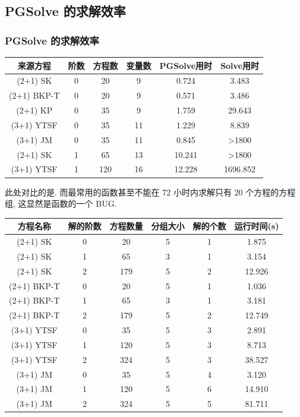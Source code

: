 \subsection{PGSolve 的求解效率}
\begin{frame}
\frametitle{PGSolve 的求解效率}
\begin{adjustbox}{max width=\textwidth}
\centering
\renewcommand{\arraystretch}{1.3}
\begin{tabular}{cccccc}
\hline
来源方程 & 阶数 & 方程数 & 变量数 & PGSolve用时 & Solve用时 \\
\hline
(2+1) SK & 0 & 20 & 9 & 0.724 & 3.483 \\
(2+1) BKP-T & 0 & 20 & 9 & 0.571 & 3.486 \\
(2+1) KP & 0 & 35 & 9 & 1.759 & 29.643 \\
(3+1) YTSF & 0 & 35 & 11 & 1.229 & 8.839 \\
(3+1) JM & 0 & 35 & 11 & 0.845 & >1800 \\
(2+1) SK & 1 & 65 & 13 & 10.241 & >1800 \\
(3+1) YTSF & 1 & 120 & 16 & 12.228 & 1696.852 \\
\hline
\end{tabular}
\end{adjustbox}

\vspace{1em}

此处对比的是. 而最常用的函数甚至不能在 72 小时内求解只有 20 个方程的方程组, 这显然是函数的一个 BUG.

\end{frame}

\begin{frame}

\begin{adjustbox}{max width=\textwidth}
\renewcommand{\arraystretch}{1.3}
\begin{tabular}{cccccc}
\hline
方程名称    & 解的阶数 & 方程数量 & 分组大小 & 解的个数 & 运行时间(s) \\ 
\hline 
(2+1) SK & 0 & 20 & 5 & 1 & 1.875 \\
(2+1) SK & 1 & 65 & 3 & 1 & 3.154 \\
(2+1) SK & 2 & 179 & 5 & 2 & 12.926 \\
(2+1) BKP-T & 0 & 20 & 5 & 1 & 1.036 \\
(2+1) BKP-T & 1 & 65 & 3 & 1 & 3.181 \\
(2+1) BKP-T & 2 & 179 & 5 & 2 & 12.749 \\
(3+1) YTSF & 0 & 35 & 5 & 3 & 2.891 \\
(3+1) YTSF & 1 & 120 & 5 & 3 & 8.713 \\
(3+1) YTSF & 2 & 324 & 5 & 3 & 38.527 \\
(3+1) JM & 0 & 35 & 5 & 4 & 3.120 \\
(3+1) JM & 1 & 120 & 5 & 6 & 14.910 \\
(3+1) JM & 2 & 324 & 5 & 5 & 81.711 \\
\hline 
\end{tabular}
\end{adjustbox}

\end{frame}
